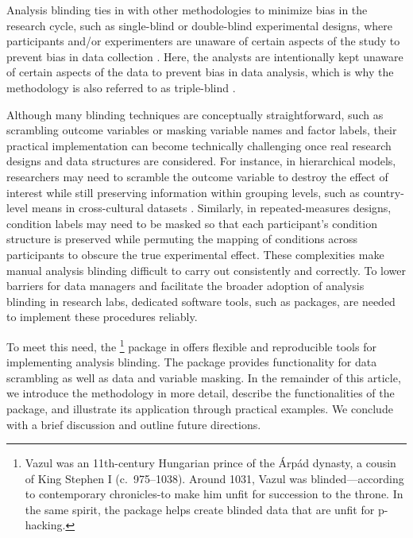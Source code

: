 Analysis blinding ties in with other methodologies to minimize bias in the research cycle, such as single-blind or double-blind experimental designs, where participants and/or experimenters are unaware of certain aspects of the study to prevent bias in data collection \citep{schulz2002blinding}. Here, the analysts are intentionally kept unaware of certain aspects of the data to prevent bias in data analysis, which is why the methodology is also referred to as triple-blind \citep{schulz2002blinding}.

Although many blinding techniques are conceptually straightforward, such as scrambling outcome variables or masking variable names and factor labels, their practical implementation can become technically challenging once real research designs and data structures are considered. For instance, in hierarchical models, researchers may need to scramble the outcome variable to destroy the effect of interest while still preserving information within grouping levels, such as country-level means in cross-cultural datasets \citep[e.g.,][]{sarafoglou2023comparing}. Similarly, in repeated-measures designs, condition labels may need to be masked so that each participant's condition structure is preserved while permuting the mapping of conditions across participants to obscure the true experimental effect. These complexities make manual analysis blinding difficult to carry out consistently and correctly. To lower barriers for data managers and facilitate the broader adoption of analysis blinding in research labs, dedicated software tools, such as  packages, are needed to implement these procedures reliably.

To meet this need, the \footnote{Vazul was an 11th-century Hungarian prince of the Árpád dynasty, a cousin of King Stephen I (c.~975--1038). Around 1031, Vazul was blinded---according to contemporary chronicles-to make him unfit for succession to the throne. In the same spirit, the  package helps create blinded data that are unfit for p-hacking.} package \citep{Nagy2026-gb} in  \citep{R2025} offers flexible and reproducible tools for implementing analysis blinding. The  package provides functionality for data scrambling as well as data and variable masking. In the remainder of this article, we introduce the methodology in more detail, describe the functionalities of the  package, and illustrate its application through practical examples. We conclude with a brief discussion and outline future directions.

